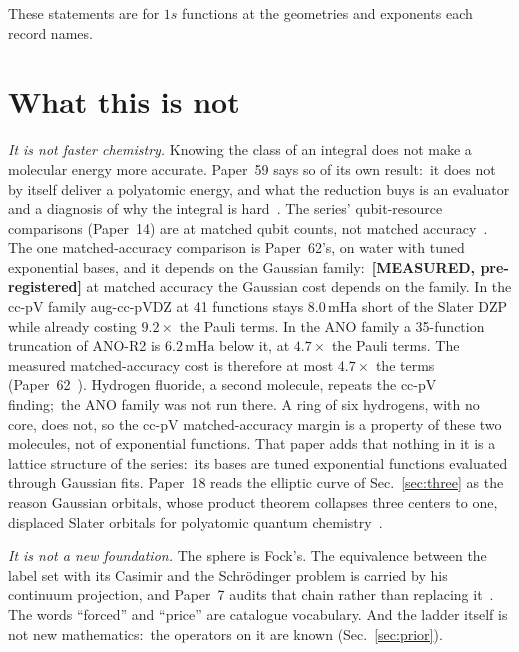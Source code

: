 \documentclass[aps,pra,twocolumn,superscriptaddress,longbibliography]{revtex4-2}
\newcommand{\gvc}[2]{#2}
\newcommand{\gvq}[2]{#2}
\newcommand{\mHa}{\,\mathrm{mHa}}
\begin{document}
\noindent These statements are for $1s$ functions at the geometries and
exponents each record names.

\section{What this is not}
\label{sec:not}

\emph{It is not faster chemistry.}  Knowing the class of an integral
does not make a molecular energy more accurate.  Paper~59 says so of its
own result:\ it does not by itself deliver a polyatomic energy, and what
the reduction buys is an evaluator and a diagnosis of why the integral
is hard~\cite{loutey_paper59}.  The series' qubit-resource comparisons
(Paper~14) are at matched qubit counts, not matched
accuracy~\cite{loutey_paper14}.
The one matched-accuracy comparison is Paper~62's, on water with tuned exponential bases, and it depends on the Gaussian family:\
\textbf{[MEASURED, pre-registered]}
\gvc{p62-matched-accuracy-ceiling}{at matched accuracy the Gaussian cost
depends on the family.  In the cc-pV family aug-cc-pVDZ at 41 functions
stays $\gvq{p62_aug_above_dzp_mha}{8.0}\mHa$ short of the Slater DZP
while already costing $\gvq{p62_aug_pauli_ratio}{9.2}\times$ the Pauli
terms.  In the ANO family a 35-function truncation of ANO-R2 is
$\gvq{p62_a35_below_dzp_mha}{6.2}\mHa$ below it, at
$\gvq{p62_a35_pauli_ratio}{4.7}\times$ the Pauli terms.  The measured
matched-accuracy cost is therefore at most $4.7\times$ the terms}
(Paper~62~\cite{loutey_paper62}).  Hydrogen fluoride, a second molecule,
repeats the cc-pV finding;\ the ANO family was not run there.  A ring of
six hydrogens, with no core, does not, so
\gvc{p62-hring-contrast}{the cc-pV matched-accuracy margin is a property of these two
molecules, not of exponential functions}.  That paper adds that nothing in it is
a lattice structure of the series:\ its bases are tuned exponential
functions evaluated through Gaussian fits.  Paper~18 reads the elliptic
curve of Sec.~\ref{sec:three} as the reason Gaussian orbitals, whose
product theorem collapses three centers to one, displaced Slater orbitals
for polyatomic quantum chemistry~\cite{loutey_paper18}.

\emph{It is not a new foundation.}  The sphere is Fock's.  The
equivalence between the label set with its Casimir and the
Schr\"odinger problem is carried by his continuum projection, and
Paper~7 audits that chain rather than replacing
it~\cite{loutey_paper7}.  The words ``forced'' and ``price'' are
catalogue vocabulary.  And the ladder itself is not new mathematics:\
the operators on it are known (Sec.~\ref{sec:prior}).
\end{document}
